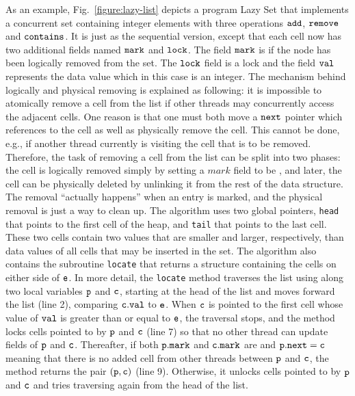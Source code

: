 As an example, Fig.~\ref{figure:lazy-list} depicts a program
Lazy Set \cite{Lazyset}
that implements a concurrent set containing integer
elements with three operations $\tt add$, $\tt remove$ and $\tt contains$.
It is just as the sequential version,
except that each cell now has two additional fields named ${\tt mark}$ and ${\tt lock}$. The field $\tt mark$ is \true\; if
the node has been logically removed from the set. The ${\tt lock}$ field is a lock and the field ${\tt val}$ represents the data value which in this case is an integer. The
mechanism behind logically and physical removing is explained as following: it is impossible to atomically remove a cell from the list if other threads may concurrently access the adjacent cells. One reason is that one must both move a $\tt next$ pointer which references to the cell as well as physically remove the cell. This cannot be done, e.g., if another thread currently is visiting the cell that is to be removed. Therefore, the task of removing a cell from the list  can be split into two phases: the cell is logically removed simply by setting a $mark$ field to be \true, and later, the cell can be physically deleted by unlinking it from the rest of the data structure. The removal “actually happens” when an entry is marked, and the physical removal is just a way to clean up.
The algorithm uses two global pointers, {\tt head} that points to  the first cell of the heap, and {\tt tail} that points to the last cell.  
These two cells contain two values that are smaller 
and larger, respectively, than data values of all cells that may be                     
inserted in the set. The algorithm also contains the subroutine {\tt locate} that returns a structure containing the cells on either side of $\tt e$. In more detail, the {\tt locate} method traverses the list using along two local variables ${\tt p}$ and $\tt c$, starting at the head of the list and moves forward the list (line 2), comparing ${\tt c.val}$ to ${\tt e}$. When $\tt c$ is pointed to the
first cell whose value of  $\tt val$ is greater than or equal to $\tt e$, the traversal stops, and the
method locks cells pointed to by $\tt p$ and $\tt c$ (line 7) so that no other thread can update fields of $\tt p$ and $\tt c$. Thereafter, if both $\tt p.mark$ and $\tt c.mark$ are \false \; and ${\tt p.next = c}$ meaning that there is no added cell from other threads between $\tt p$ and $\tt c$, the method returns the pair $\tt (p,c)$ (line 9). Otherwise, it unlocks cells pointed to by $\tt p$ and $\tt c$ and tries traversing again from the head of the list.



